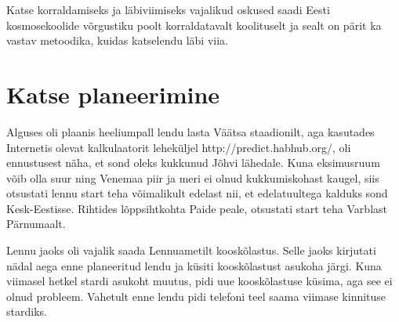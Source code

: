\documentclass{trkut}%
\begin{document}
Katse korraldamiseks ja läbiviimiseks vajalikud oskused saadi Eesti kosmosekoolide võrgustiku poolt korraldatavalt koolituselt ja sealt on pärit ka vastav metoodika, kuidas katselendu läbi viia.

\section{Katse planeerimine}
Alguses oli plaanis heeliumpall lendu lasta Väätsa staadionilt, aga kasutades Internetis olevat kalkulaatorit leheküljel http://predict.habhub.org/, oli ennustusest näha, et sond oleks kukkunud Jõhvi lähedale. Kuna eksimusruum võib olla suur ning Venemaa piir ja meri ei olnud kukkumiskohast kaugel, siis otsustati lennu start teha võimalikult edelast nii, et edelatuultega kalduks sond Kesk-Eestisse. Rihtides lõppsihtkohta Paide peale, otsustati start teha Varblast Pärnumaalt.

Lennu jaoks oli vajalik saada Lennuametilt kooskõlastus. Selle jaoks kirjutati nädal aega enne planeeritud lendu ja küsiti kooskõlastust asukoha järgi. Kuna viimasel hetkel stardi asukoht muutus, pidi uue kooskõlastuse küsima, aga see ei olnud probleem. Vahetult enne lendu pidi telefoni teel saama viimase kinnituse stardiks.
\end{document}
